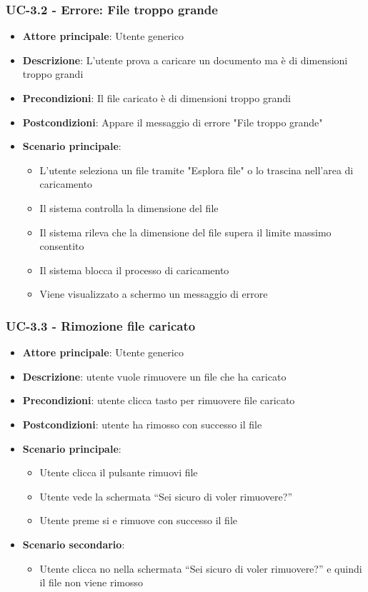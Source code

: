 \documentclass[11pt,a4paper]{article}
\begin{document}
\subsubsection{UC-3.2 - Errore: File troppo grande}
\begin{itemize}
    \item \textbf{Attore principale}: Utente generico
    \item \textbf{Descrizione}: L'utente prova a caricare un documento ma è di dimensioni troppo grandi
    \item \textbf{Precondizioni}: Il file caricato è di dimensioni troppo grandi
    \item \textbf{Postcondizioni}: Appare il messaggio di errore "File troppo grande"
    \item \textbf{Scenario principale}:
        \begin{itemize}
            \item L'utente seleziona un file tramite "Esplora file" o lo trascina nell'area di caricamento
            \item Il sistema controlla la dimensione del file
            \item Il sistema rileva che la dimensione del file supera il limite massimo consentito
            \item Il sistema blocca il processo di caricamento
            \item Viene visualizzato a schermo un messaggio di errore
        \end{itemize}
\end{itemize}

\subsubsection{UC-3.3 - Rimozione file caricato}
\begin{itemize}
    \item \textbf{Attore principale}: Utente generico
    \item \textbf{Descrizione}: utente vuole rimuovere un file che ha caricato
    \item \textbf{Precondizioni}: utente clicca tasto per rimuovere file caricato
    \item \textbf{Postcondizioni}: utente ha rimosso con successo il file
    \item \textbf{Scenario principale}:
        \begin{itemize}
            \item Utente clicca il pulsante rimuovi file
            \item Utente vede la schermata “Sei sicuro di voler rimuovere?”
            \item Utente preme si e rimuove con successo il file
        \end{itemize}
        \item \textbf{Scenario secondario}:
        \begin{itemize}
            \item Utente clicca no nella schermata “Sei sicuro di voler rimuovere?” e quindi il file non viene rimosso
        \end{itemize}
\end{itemize}
\end{document}
